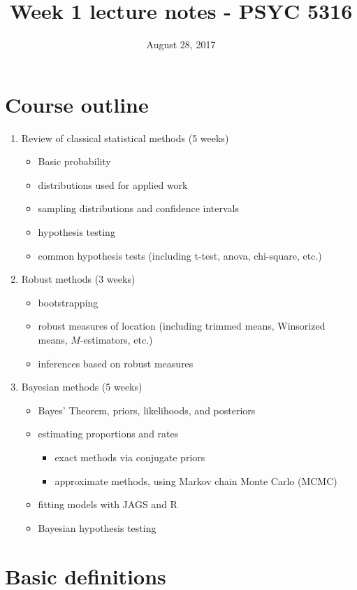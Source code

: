 \documentclass[11pt]{article}
\date{August 28, 2017}
\title{Week 1 lecture notes - PSYC 5316}
\begin{document}
\maketitle

\section*{Course outline}
\label{sec-1}

\begin{enumerate}
\item Review of classical statistical methods (5 weeks)
\begin{itemize}
\item Basic probability
\item distributions used for applied work
\item sampling distributions and confidence intervals
\item hypothesis testing
\item common hypothesis tests (including t-test, anova, chi-square, etc.)
\end{itemize}
\item Robust methods (3 weeks)
\begin{itemize}
\item bootstrapping
\item robust measures of location (including trimmed means, Winsorized means, $M$-estimators, etc.)
\item inferences based on robust measures
\end{itemize}
\item Bayesian methods (5 weeks)
\begin{itemize}
\item Bayes' Theorem, priors, likelihoods, and posteriors
\item estimating proportions and rates 
\begin{itemize}
\item exact methods via conjugate priors
\item approximate methods, using Markov chain Monte Carlo (MCMC)
\end{itemize}
\item fitting models with JAGS and R
\item Bayesian hypothesis testing
\end{itemize}
\end{enumerate}

\section*{Basic definitions}
\label{sec-2}
\end{document}
